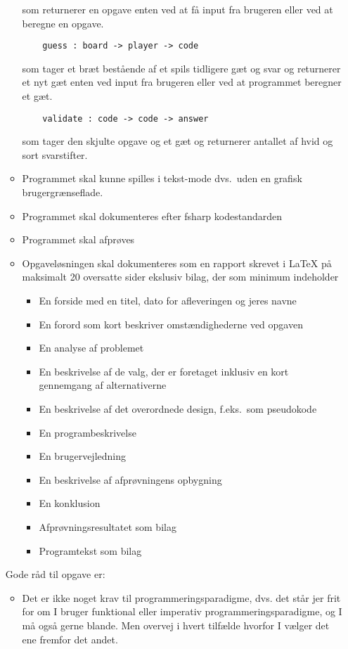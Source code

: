 \documentclass[a4paper,12pt]{article}
\begin{document}
\begin{enumerate}[label=8g.\arabic*,start=0]
\begin{itemize}
\begin{lstlisting}
  \end{lstlisting}
  som returnerer en opgave enten ved at få input fra brugeren eller ved at beregne en opgave.
  \begin{lstlisting}
    guess : board -> player -> code
  \end{lstlisting}
  som tager et bræt bestående af et spils tidligere gæt og svar og returnerer et nyt gæt enten ved input fra brugeren eller ved at programmet beregner et gæt.
  \begin{lstlisting}
    validate : code -> code -> answer
  \end{lstlisting}
  som tager den skjulte opgave og et gæt og returnerer antallet af hvid og sort svarstifter.
\item Programmet skal kunne spilles i tekst-mode dvs.\ uden en grafisk brugergrænseflade.
\item Programmet skal dokumenteres efter fsharp kodestandarden
\item Programmet skal afprøves
  \item Opgaveløsningen skal dokumenteres som en rapport skrevet i LaTeX på maksimalt 20 oversatte sider ekslusiv bilag, der som minimum indeholder
    \begin{itemize}
    \item En forside med en titel, dato for afleveringen og jeres navne
    \item En forord som kort beskriver omstændighederne ved opgaven
    \item En analyse af problemet
    \item En beskrivelse af de valg, der er foretaget inklusiv en kort gennemgang af alternativerne
    \item En beskrivelse af det overordnede design, f.eks.\ som pseudokode
    \item En programbeskrivelse
    \item En brugervejledning
    \item En beskrivelse af afprøvningens opbygning
    \item En konklusion
    \item Afprøvningsresultatet som bilag
    \item Programtekst som bilag
    \end{itemize}
  \end{itemize}
  Gode råd til opgave er:
  \begin{itemize}
  \item Det er ikke noget krav til programmeringsparadigme, dvs. det står jer frit for om I bruger funktional eller imperativ programmeringsparadigme, og I må også gerne blande. Men overvej i hvert tilfælde hvorfor I vælger det ene fremfor det andet.

\end{itemize}
\end{enumerate}
\end{document}
